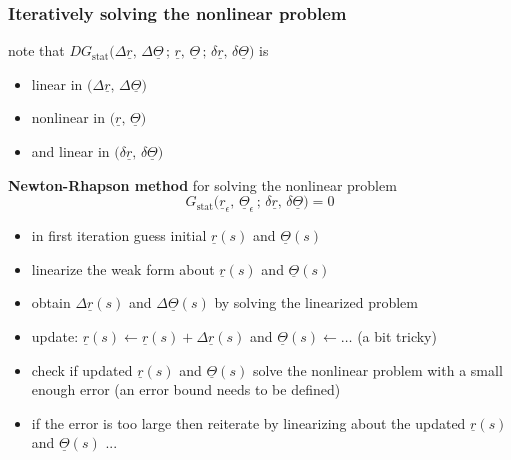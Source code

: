 \begin{frame}
  \frametitle{Iteratively solving the nonlinear problem}
  
  note that $DG_{\text{stat}} \bigl( \Delta \underline{r} , \, \Delta \underline{\Theta} \, ; \,\underline{r} , \, \underline{\Theta} \, ; \, \delta \underline{r} , \, \delta \underline{\Theta} \bigr)$ is
  \begin{itemize}
    \item linear in $\bigl( \Delta \underline{r} , \, \Delta \underline{\Theta} \bigr)$
    \item nonlinear in $\bigl( \underline{r} , \, \underline{\Theta} \bigr)$
    \item and linear in $\bigl( \delta \underline{r} , \, \delta \underline{\Theta} \bigr)$
  \end{itemize}

  \vspace{1em}
  \textbf{Newton-Rhapson method} for solving the nonlinear problem
  \begin{displaymath}
    G_{\text{stat}} \bigl( \underline{r}_{\epsilon} , \, \underline{\Theta}_{\epsilon} \, ; \, \delta \underline{r} , \, \delta \underline{\Theta} \bigr) = 0
  \end{displaymath}
  
  \begin{itemize}
    \item in first iteration guess initial $\underline{r}(s)$ and $\underline{\Theta}(s)$
    \item linearize the weak form about $\underline{r}(s)$ and $\underline{\Theta}(s)$
    \item obtain $\Delta \underline{r}(s)$ and $\Delta \underline{\Theta}(s)$ by solving the linearized problem 
    \item update: $\underline{r}(s) \leftarrow \underline{r}(s) + \Delta \underline{r}(s)$ and $\underline{\Theta}(s) \leftarrow \dots$ (a bit tricky) %
    \item check if updated $\underline{r}(s)$ and $\underline{\Theta}(s)$ solve the nonlinear problem \newline with a small enough error \: (an error bound needs to be defined)
    \item if the error is too large then reiterate by linearizing about the updated $\underline{r}(s)$ and $\underline{\Theta}(s)$ ...
  \end{itemize}

\end{frame}


